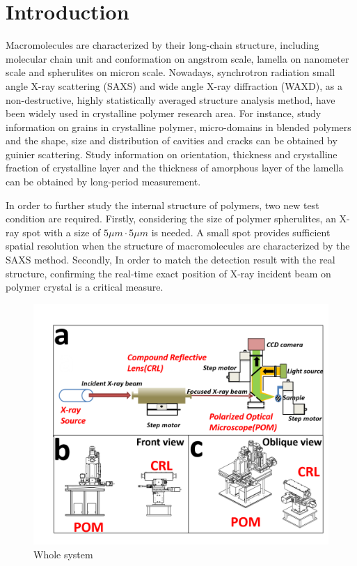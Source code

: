 \documentclass{Head}
\begin{document}
\tableofcontents
\linenumbers
\section{Introduction}
Macromolecules are characterized by their long-chain structure, including molecular chain unit and conformation on angstrom scale, lamella on nanometer scale and spherulites on micron scale.
Nowadays, synchrotron radiation small angle X-ray scattering (SAXS) and wide angle X-ray diffraction (WAXD), as a non-destructive, highly statistically averaged structure analysis method, have been widely used in crystalline polymer research area.
For instance, study information on grains in crystalline polymer, micro-domains in blended polymers and the shape, size and distribution of cavities and cracks can be obtained by guinier scattering.
Study information on orientation, thickness and crystalline fraction of crystalline layer and the thickness of amorphous layer of the lamella can be obtained by long-period measurement.


In order to further study the internal structure of polymers, two new test condition are required.
Firstly, considering the size of polymer spherulites, an X-ray spot with a size of $5\mu m \cdot 5\mu m$ is needed.
A small spot provides sufficient spatial resolution when the structure of macromolecules are characterized by the SAXS method.
Secondly, In order to match the detection result with the real structure, confirming the real-time exact position of X-ray incident beam on polymer crystal is a critical measure.
\begin{figure}
  \centering
  \includegraphics[scale=0.5]{Figures/Fig1WholeSystem.png}
  \caption{Whole system}
  \label{WholeSystem}
\end{figure}
\end{document}

